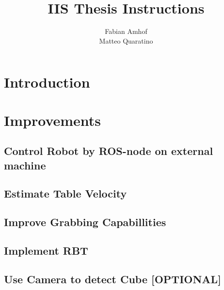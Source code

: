 \documentclass[report]{iisthesis}
\title{IIS Thesis Instructions}
\author{Fabian Amhof \\ Matteo Quaratino}
\begin{document}
\maketitle
\tableofcontents

\chapter{Introduction}
\chapter{Improvements}

\section{Control Robot by ROS-node on external machine}

\section{Estimate Table Velocity}

\section{Improve Grabbing Capabillities}

\section{Implement RBT}

\section{Use Camera to detect Cube [OPTIONAL]}
\end{document}

